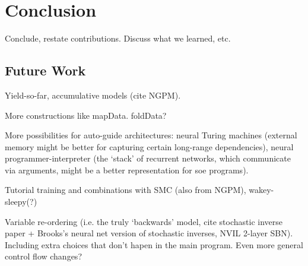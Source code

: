 \section{Conclusion}
\label{sec:conclusion}

Conclude, restate contributions. Discuss what we learned, etc.

\subsection{Future Work}
\label{sec:conclusion_futureWork}

Yield-so-far, accumulative models (cite NGPM).

More constructions like mapData. foldData?

More possibilities for auto-guide architectures: neural Turing machines (external memory might be better for capturing certain long-range dependencies), neural programmer-interpreter (the `stack' of recurrent networks, which communicate via arguments, might be a better representation for soe programs).

Tutorial training and combinations with SMC (also from NGPM), wakey-sleepy(?)

Variable re-ordering (i.e. the truly `backwards' model, cite stochastic inverse paper + Brooks's neural net version of stochastic inverses, NVIL 2-layer SBN). Including extra choices that don't hapen in the main program. Even more general control flow changes?

